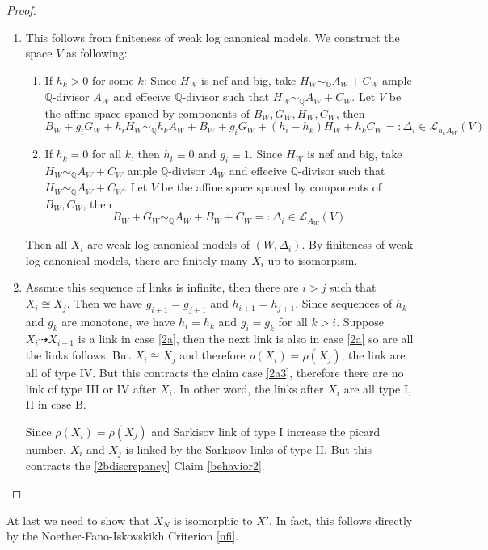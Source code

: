 \documentclass{article}
\begin{document}
\begin{proof}
\begin{enumerate}
  \item This follows from finiteness of weak log canonical models. We construct the space $V$ as following: 
\begin{enumerate}
  \item If $h_{k}>0$ for some $k$: Since $H_{W}$ is nef and big,  take  $H_{W}\sim_{\mathbb{Q}}A_{W}+C_{W}$  ample $\mathbb{Q}$-divisor $A_{W}$ and effecive $\mathbb{Q}$-divisor such that $H_{W}\sim_{\mathbb{Q}}A_{W}+C_{W}$. Let $V$ be the affine space spaned by components of  $B_{W},G_{W},H_{W},C_{W}$, then 
    \[
      B_{W}+g_{i}G_{W}+h_{i}H_{W}\sim_{\mathbb{Q}} h_{k}A_{W}+B_{W}+g_{i}G_{W}+(h_{i}-h_{k})H_{W}+h_{k}C_{W}=:\Delta_{i} \in \mathcal{L}_{h_{k}A_{W}}(V)
    \]
  \item If $h_{k}=0$ for all $k$, then $h_{i}\equiv 0$ and $g_{i}\equiv 1$.  Since $H_{W}$ is nef and big,  take  $H_{W}\sim_{\mathbb{Q}}A_{W}+C_{W}$  ample $\mathbb{Q}$-divisor $A_{W}$ and effecive $\mathbb{Q}$-divisor such that $H_{W}\sim_{\mathbb{Q}}A_{W}+C_{W}$. Let $V$ be the affine space spaned by components of  $B_{W},C_{W}$, then 
    \[
      B_{W}+G_{W}\sim_{\mathbb{Q}} A_{W}+B_{W}+C_{W}=:\Delta_{i} \in \mathcal{L}_{A_{W}}(V)
    \]
\end{enumerate}
Then all $X_{i}$ are weak log canonical models of $(W,\Delta_{i})$. By finiteness of weak log canonical models, there are finitely many $X_{i}$ up to isomorpism.
\item Assmue this sequence of links is infinite, then there are $i>j$ such that $X_{i}\cong X_{j}$. Then we have $g_{i+1}=g_{j+1}$ and $h_{i+1}=h_{j+1}$. Since sequences of $h_{k}$ and $g_{k}$ are monotone, we have $h_{i}=h_{k}$ and  $g_{i}=g_{k}$ for all $k>i$. Suppose $X_{i}\dashrightarrow X_{i+1}$ is a link in case \ref{2a}, then the next link is also in case \ref{2a}  so are all the links follows. But $X_{i}\cong X_{j}$ and therefore $\rho(X_{i})=\rho(X_{j})$, the link are all of type IV. But this contracts the claim case \ref{2a3}, therefore there are no link of type III or IV after $X_{i}$. In other word, the links after $X_{i}$ are all type I, II in case B.

  Since $\rho(X_{i})= \rho(X_{j})$ and Sarkisov link of type I increase the picard number, $X_{i}$  and $X_{j}$ is linked by  the Sarkisov links of type II. But this contracts the \ref{2bdiscrepancy} Claim \ref{behavior2}.
\end{enumerate}  
\end{proof}
At last we need to show that $X_{N}$ is isomorphic to $X'$. In fact, this follows directly by the Noether-Fano-Iskovskikh Criterion \ref{nfi}.
\end{document}
